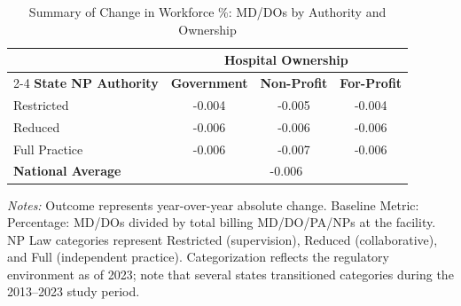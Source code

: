 \begin{table}[htbp]
    \centering
    \caption{Summary of Change in Workforce \%: MD/DOs by Authority and Ownership}
    \label{tab:d_pct_md}
    \vspace{0.2cm}
    \begin{tabular}{lccc}
        \toprule
        & \multicolumn{3}{c}{\textbf{Hospital Ownership}} \\
        \cmidrule(lr){2-4}
        \textbf{State NP Authority} & \textbf{Government} & \textbf{Non-Profit} & \textbf{For-Profit} \\
        \midrule
        Restricted & -0.004 & -0.005 & -0.004 \\
        Reduced & -0.006 & -0.006 & -0.006 \\
        Full Practice & -0.006 & -0.007 & -0.006 \\
        \midrule
        \textbf{National Average} & \multicolumn{3}{c}{-0.006} \\
        \bottomrule
    \end{tabular}
    \vspace{0.1cm}
    \begin{minipage}{0.85\textwidth}
        \footnotesize \textit{Notes:} Outcome represents year-over-year absolute change. Baseline Metric: Percentage: MD/DOs divided by total billing MD/DO/PA/NPs at the facility. NP Law categories represent Restricted (supervision), Reduced (collaborative), and Full (independent practice). Categorization reflects the regulatory environment as of 2023; note that several states transitioned categories during the 2013--2023 study period.
    \end{minipage}
\end{table}